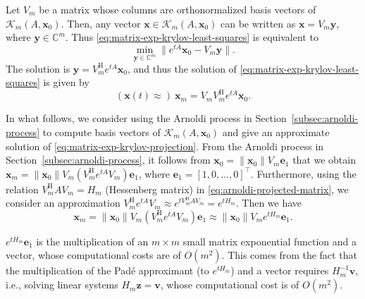 {Let $V_m$ be a matrix whose columns are orthonormalized basis vectors of $\mathcal{K}_m(A,\boldsymbol{x}_0)$. Then, any vector $\boldsymbol{x}\in\mathcal{K}_m(A,\boldsymbol{x}_0)$ can be written as $\boldsymbol{x}=V_m\boldsymbol{y}$, where $\boldsymbol{y}\in\mathbb{C}^m$. Thus \eqref{eq:matrix-exp-krylov-least-squares} is equivalent to}
\[\min_{\boldsymbol{y}\in\mathbb{C}^m}\|e^{tA}\boldsymbol{x}_0-V_m\boldsymbol{y}\|.\]
{The solution is $\boldsymbol{y}=V_m^{\mathrm H}e^{tA}\boldsymbol{x}_0$, and thus the solution of \eqref{eq:matrix-exp-krylov-least-squares} is given by}
\begin{equation}\label{eq:matrix-exp-krylov-projection}(\boldsymbol{x}(t)\approx)\ \boldsymbol{x}_m=V_mV_m^{\mathrm H}e^{tA}\boldsymbol{x}_0.\end{equation}

{In what follows, we consider using the Arnoldi process in Section~\ref{subsec:arnoldi-process} to compute basis vectors of $\mathcal{K}_m(A,\boldsymbol{x}_0)$ and give an approximate solution of \eqref{eq:matrix-exp-krylov-projection}. From the Arnoldi process in Section~\ref{subsec:arnoldi-process}, it follows from $\boldsymbol{x}_0=\|\boldsymbol{x}_0\|V_m\boldsymbol{e}_1$ that we obtain $\boldsymbol{x}_m=\|\boldsymbol{x}_0\|V_m(V_m^{\mathrm H}e^{tA}V_m)\boldsymbol{e}_1$, where $\boldsymbol{e}_1=[1,0,\ldots,0]^{\top}$. Furthermore, using the relation $V_m^{\mathrm H}AV_m=H_m$ (Hessenberg matrix) in \eqref{eq:arnoldi-projected-matrix}, we consider an approximation $V_m^{\mathrm H}e^{tA}V_m\approx e^{tV_m^{\mathrm H}AV_m}=e^{tH_m}$. Then we have}
\begin{equation}\label{eq:matrix-exp-arnoldi-approximation}\boldsymbol{x}_m=\|\boldsymbol{x}_0\|V_m(V_m^{\mathrm H}e^{tA}V_m)\boldsymbol{e}_1\approx\|\boldsymbol{x}_0\|V_me^{tH_m}\boldsymbol{e}_1.\end{equation}

{$e^{tH_m}\boldsymbol{e}_1$ is the multiplication of an $m\times m$ small matrix exponential function and a vector, whose computational costs are of $O(m^2)$. This comes from the fact that the multiplication of the Padé approximant (to $e^{tH_m}$) and a vector requires $H_m^{-1}\boldsymbol{v}$, i.e., solving linear systems $H_m\boldsymbol{z}=\boldsymbol{v}$, whose computational cost is of $O(m^2)$.}

